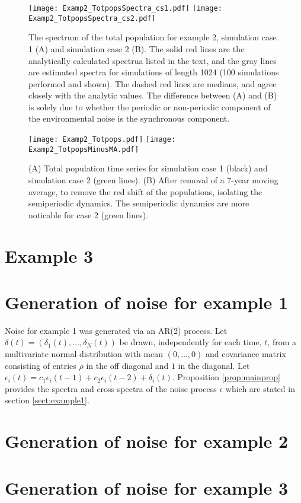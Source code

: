 \documentclass[letterpaper,11pt]{article}
\begin{document}
\begin{figure}
\texttt{[image: Examp2\_TotpopsSpectra\_cs1.pdf]}
\texttt{[image: Examp2\_TotpopsSpectra\_cs2.pdf]}
\caption{The spectrum of the total population for example 2, simulation case 1 (A) and simulation case 2 (B). The solid red lines are the analytically calculated spectrua listed in the text, and the gray lines are estimated spectra for simulations of length 1024 (100 simulations performed and shown). The dashed red lines are medians, and agree closely with the analytic values. The difference between (A) and (B) is solely due to whether the periodic or non-periodic component of the environmental noise is the synchronous component.}\label{fig:example2_totpopspec}
\end{figure}

\begin{figure}
\texttt{[image: Examp2\_Totpops.pdf]}
\texttt{[image: Examp2\_TotpopsMinusMA.pdf]}
\caption{(A) Total population time series for simulation case 1 (black) and simulation case 2 (green lines). (B) After removal of a 7-year moving average, to remove the red
shift of the populations, isolating the semiperiodic dynamics. The semiperiodic dynamics
are more noticable for case 2 (green lines). }\label{fig:example2_popts}
\end{figure}

\section{Example 3}\label{sec:example3}


\section{Generation of noise for example 1}\label{sec:noise1}

Noise for example 1 was generated via an AR(2) process. Let 
$\delta(t) = (\delta_1(t),\ldots,\delta_N(t))$ be drawn, independently for 
each time, $t$, from a multivariate normal distribution with mean $(0,\ldots,0)$
and covariance matrix consisting of entries $\rho$ in the off diagonal and $1$
in the diagonal. Let $\epsilon_i(t)=c_1 \epsilon_i(t-1) + c_2 \epsilon_i(t-2)+\delta_i(t)$. Proposition \ref{prop:mainprop} provides the spectra
and cross spectra of the noise process $\epsilon$ which are stated in section
\ref{sect:example1}.

\section{Generation of noise for example 2}\label{sec:noise2}


\section{Generation of noise for example 3}\label{sec:noise3}



\end{document}
